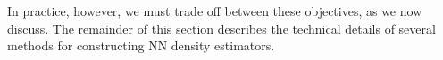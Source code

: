 In practice, however, we must trade off between these objectives, as we now discuss. The remainder of this section describes the technical details of several methods for constructing NN density estimators.







